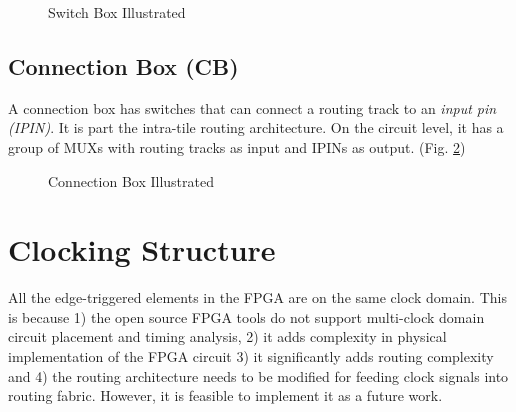 \begin{figure}[htp]
	\begin{center}
		\renewcommand{\captionfont}{\small}
		
		\hspace*{\fill}		
		 \hfill
		\hspace*{\fill}
		
		\caption{Switch Box Illustrated}
		\label{fig:sb_illu}
	\end{center}
\end{figure}

\subsection{Connection Box (CB)}
A connection box has switches that can connect a routing track to an \emph{input pin (IPIN)}. It is part the intra-tile routing architecture.
On the circuit level, it has a group of MUXs with routing tracks as input and IPINs as output. (Fig. \ref{fig:cb_illu})

\begin{figure}[htp]
	\begin{center}
		\renewcommand{\captionfont}{\small}
		
		\hspace*{\fill}		
		 \hfill
		\hspace*{\fill}		
		
		\caption{Connection Box Illustrated}
		\label{fig:cb_illu}
	\end{center}
\end{figure}

\section{Clocking Structure}
\label{sec:clocking}

All the edge-triggered elements in the FPGA are on the same clock domain. This is because 1) 
the open source FPGA tools do not support multi-clock domain circuit placement and timing analysis, 2) 
it adds complexity in physical implementation of the FPGA circuit 3) 
it significantly adds routing complexity and 4) the routing architecture needs
 to be modified for feeding clock signals into routing fabric. However, it is feasible to implement it as a future work. \par

